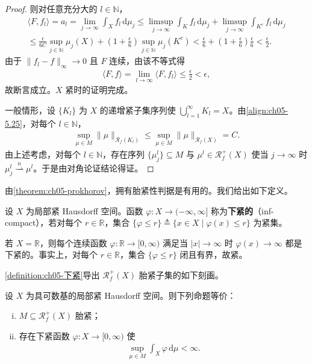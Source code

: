 \documentclass[../../main.tex]{subfiles}%
\begin{document}
\begin{proof}
则对任意充分大的 $l\in\mathbb{N}$，
\begin{align*}
\langle F,f_l\rangle=a_l
=\lim_{j\to\infty}\int_X f_l\,\mathrm{d}\mu_j
\leqslant\limsup_{j\to\infty}\int_K f_l\,\mathrm{d}\mu_j
+\limsup_{j\to\infty}\int_{K^c}f_l\,\mathrm{d}\mu_j\\
\leqslant\frac{\epsilon}{6C}\sup_{j\in\mathbb{N}}\mu_j(X)
+\left(1+\frac{\epsilon}{6}\right)\sup_{j\in\mathbb{N}}\mu_j(K^c)
<\frac{\epsilon}{6}+\left(1+\frac{\epsilon}{6}\right)\frac{\epsilon}{6}
<\frac{\epsilon}{2}.
\end{align*}
由于 $\|f_l-f\|_\infty\to0$ 且 $F$ 连续，由该不等式得
\begin{align*}
\langle F,f\rangle=\lim_{l\to\infty}\langle F,f_l\rangle
\leqslant\frac{\epsilon}{2}<\epsilon,
\end{align*}
故断言成立。$X$ 紧时的证明完成。

一般情形，设 $\{K_l\}$ 为 $X$ 的递增紧子集序列使 $\bigcup_{l=1}^\infty K_l=X$。由\eqref{align:ch05-5.25}，对每个 $l\in\mathbb{N}$，
\begin{align*}
\sup_{\mu\in M}\|\mu\|_{\mathscr{R}_f(K_l)}
\leqslant\sup_{\mu\in M}\|\mu\|_{\mathscr{R}_f(X)}=C.
\end{align*}
由上述考虑，对每个 $l\in\mathbb{N}$，存在序列 $\{\mu_j^l\}\subseteq M$ 与 $\mu^l\in\mathscr{R}^+_f(X)$ 使当 $j\to\infty$ 时 $\mu_j^l\stackrel{n}{\rightharpoonup}\mu^l$。于是由对角论证结论得证。
\end{proof}

由\cref{theorem:ch05-prokhorov}，拥有胎紧性判据是有用的。我们给出如下定义。

\begin{definition}\label{definition:ch05-下紧}
设 $X$ 为局部紧 Hausdorff 空间。函数 $\varphi:X\to(-\infty,\infty]$ 称为\textbf{下紧的}（inf-compact），若对每个 $r\in\mathbb{R}$，集合 $\{\varphi\leqslant r\}\triangleq \{x\in X\mid\varphi(x)\leqslant r\}$ 为紧集。
\end{definition}

\begin{example}\label{example:ch05-下紧}
若 $X=\mathbb{R}$，则每个连续函数 $\varphi:\mathbb{R}\to[0,\infty)$ 满足当 $|x|\to\infty$ 时 $\varphi(x)\to\infty$ 都是下紧的。事实上，对每个 $r\in\mathbb{R}$，集合 $\{\varphi\leqslant r\}$ 闭且有界，故紧。
\end{example}

\cref{definition:ch05-下紧}导出 $\mathscr{R}^+_f(X)$ 胎紧子集的如下刻画。

\begin{proposition}\label{proposition:ch05-胎紧判据}
设 $X$ 为具可数基的局部紧 Hausdorff 空间。则下列命题等价：
\begin{enumerate}[(i)]
\item\label{item:ch05-tight-i} $M\subseteq\mathscr{R}^+_f(X)$ 胎紧；
\item\label{item:ch05-tight-ii} 存在下紧函数 $\varphi:X\to[0,\infty)$ 使
\begin{align}
\sup_{\mu\in M}\int_X\varphi\,\mathrm{d}\mu<\infty.\label{align:ch05-5.29}
\end{align}
\end{enumerate}
\end{proposition}
\end{document}
